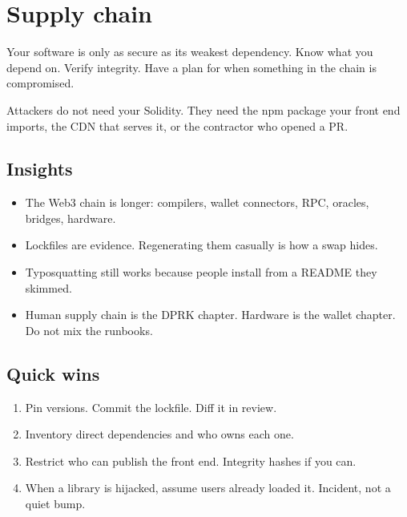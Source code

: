 \chapter{Supply chain}

Your software is only as secure as its weakest
dependency. Know what you depend on. Verify integrity.
Have a plan for when something in the chain is
compromised.

Attackers do not need your Solidity. They need the npm
package your front end imports, the CDN that serves it,
or the contractor who opened a PR.

\section{Insights}

\begin{itemize}
  \item The Web3 chain is longer: compilers, wallet
  connectors, RPC, oracles, bridges, hardware.
  \item Lockfiles are evidence. Regenerating them
  casually is how a swap hides.
  \item Typosquatting still works because people install
  from a README they skimmed.
  \item Human supply chain is the DPRK chapter. Hardware
  is the wallet chapter. Do not mix the runbooks.
\end{itemize}

\section{Quick wins}

\begin{enumerate}
  \item Pin versions. Commit the lockfile. Diff it in
  review.
  \item Inventory direct dependencies and who owns each
  one.
  \item Restrict who can publish the front end. Integrity
  hashes if you can.
  \item When a library is hijacked, assume users already
  loaded it. Incident, not a quiet bump.
\end{enumerate}
